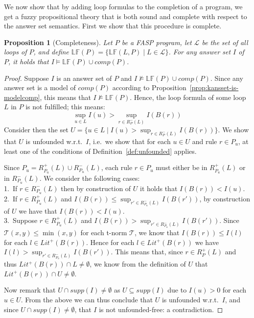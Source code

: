 \documentclass{tlp}
\newcommand{\body}[1]{\ensuremath{B(#1)}}
\newcommand{\comp}[1]{\ensuremath{comp(#1)}}
\newcommand{\poslit}[1]{\ensuremath{Lit^{+}(#1)}}
\newcommand{\posbody}[1]{\ensuremath{\poslit{\body{#1}}}}
\newcommand{\looprules}[2]{R^{+}_{#1}(#2)}
\newcommand{\nonlooprules}[2]{R^{-}_{#1}(#2)}
\newcommand{\loopform}[2]{\mathbb{LF}(#1,#2)}
\newcommand{\loopformprog}[1]{\mathbb{LF}(#1)}
\newcommand{\supp}[1]{\ensuremath{\mathit{supp}(#1)}}
\newcommand{\pretnorm}{\mathcal{T}}
\newtheorem{proposition}{Proposition}
\begin{document}
 We now show that by adding loop formulas to the completion of a program, we get a fuzzy propositional theory that is both sound and complete with respect to the answer set semantics. First we show that this procedure is complete.
 


\begin{proposition}[Completeness]\label{prop:loopforms-complete}
 Let $P$ be a FASP program, let $\mathcal{L}$ be the set of all loops of $P$, and define $\loopformprog{P} = \{ \loopform{L}{P} \mid L \in \mathcal{L} \}$.  For any answer set $I$ of $P$, it holds that $I \models \loopformprog{P} \cup \comp{P}$. 
\end{proposition}
\begin{proof}
 Suppose $I$ is an answer set of $P$ and $I \not\models \loopformprog{P} \cup \comp{P}$. Since any answer set is a model of $\comp{P}$ according to Proposition~\ref{prop:kansset-is-modelcomp}, this means that $I \not\models \loopformprog{P}$. Hence, the loop formula of some loop $L$ in $P$ is not fulfilled; this means:
  $$\sup_{u \in L} I(u) > \sup_{r \in \nonlooprules{P}{L}} I(\body{r})$$
 Consider then the set $U = \{ u \in L \mid I(u) > \sup_{r \in \nonlooprules{P}{L}} I(\body{r}) \}$.
 We show that $U$ is unfounded w.r.t.~$I$, i.e.~we show that for each $u \in U$ and rule $r \in P_u$, at least one of the conditions of Definition~\ref{def:unfounded} applies.
 
 Since $P_u = \looprules{P_u}{L} \cup \nonlooprules{P_u}{L}$, each rule $r \in P_u$ must either be in $\looprules{P_u}{L}$ or in $\nonlooprules{P_u}{L}$. We consider the following cases:\\
\phantom{xx}1.~If $r \in \nonlooprules{P_u}{L}$ then by construction of $U$ it holds that $I(\body{r}) < I(u)$.\\
  \phantom{xx}2.~If $r \in \looprules{P_u}{L}$ and $I(\body{r}) \leq \sup_{r' \in \nonlooprules{P_u}{L}} I(\body{r'})$, by construction of $U$ we have that $I(\body{r}) < I(u)$.\\
   \phantom{xx}3.~Suppose $r \in \looprules{P_u}{L}$ and $I(\body{r}) > \sup_{r' \in \nonlooprules{P_u}{L}} I(\body{r'})$. Since $\pretnorm(x,y) \leq \min(x,y)$ for each t-norm $\pretnorm$, we know that $I(\body{r}) \leq I(l)$ for each $l \in \posbody{r}$. Hence for each $l \in \posbody{r}$ we have $I(l) > \sup_{r' \in \nonlooprules{P_u}{L}} I(\body{r'})$. This means that, since $r \in \looprules{P}{L}$ and thus $\posbody{r} \cap L \neq \emptyset$, we know from the definition of $U$ that $\posbody{r} \cap U \neq \emptyset$.


Now remark that $U \cap \supp{I} \neq \emptyset$ as $U \subseteq \supp{I}$ due to $I(u) > 0$ for each $u \in U$.
From the above we can thus conclude that $U$ is unfounded w.r.t.~$I$, and since $U \cap \supp{I} \neq \emptyset$, that $I$ is not unfounded-free: a contradiction.
\end{proof}
\end{document}
